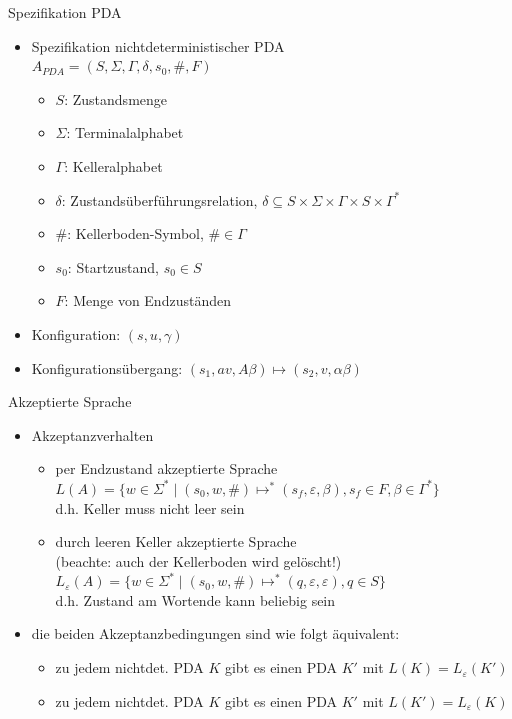 \begin{frame}{Spezifikation PDA}
	\begin{itemize}
		\item Spezifikation nichtdeterministischer PDA\\
		$A_{PDA}=(S, \Sigma, \Gamma, \delta, s_0, \#, F)$
		\begin{itemize}
			\item $S$: Zustandsmenge
			\item $\Sigma$: Terminalalphabet
			\item $\Gamma$: Kelleralphabet
			\item $\delta$: Zustandsüberführungsrelation, $\delta \subseteq S \times \Sigma \times \Gamma \times S \times \Gamma^*$
			\item $\#$: Kellerboden-Symbol, $\# \in \Gamma$
			\item $s_0$: Startzustand, $s_0 \in S$
			\item $F$: Menge von Endzuständen
		\end{itemize}
		\item Konfiguration: $(s, u, \gamma)$
		\item Konfigurationsübergang: $(s_1, av, A\beta) \mapsto (s_2, v, \alpha\beta)$
	\end{itemize}
	\centering
\end{frame}

\begin{frame}{Akzeptierte Sprache}
	\begin{itemize}
		\item Akzeptanzverhalten
		\begin{itemize}
			\item per Endzustand akzeptierte Sprache\\
			$L(A)=\{w \in \Sigma^* \mid (s_0, w, \#) \mapsto^* (s_f, \varepsilon, \beta), s_f \in F, \beta \in \Gamma^*\}$\\
			d.h. Keller muss nicht leer sein
			\item durch leeren Keller akzeptierte Sprache\\
			(beachte: auch der Kellerboden wird gelöscht!)\\
			$L_\varepsilon(A)=\{w \in \Sigma^*\mid (s_0, w, \#) \mapsto^* (q, \varepsilon, \varepsilon), q \in S\}$\\
			d.h. Zustand am Wortende kann beliebig sein
		\end{itemize}
		\item die beiden Akzeptanzbedingungen sind wie folgt äquivalent:
		\begin{itemize}
			\item zu jedem nichtdet. PDA $K$ gibt es einen PDA $K'$ mit $L(K) = L_\varepsilon(K')$
			\item zu jedem nichtdet. PDA $K$ gibt es einen PDA $K'$ mit $L(K') = L_\varepsilon(K)$
		\end{itemize}
	\end{itemize}
\end{frame}

